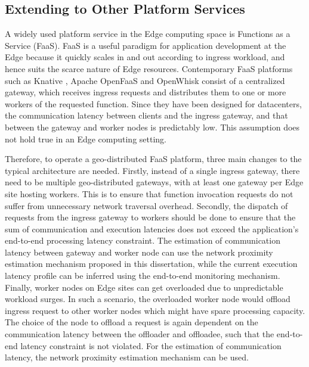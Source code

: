 \subsection{Extending to Other Platform Services}
A widely used platform service in the Edge computing space is Functions as a Service (FaaS). FaaS is a useful paradigm for application development at the Edge because it quickly scales in and out according to ingress workload, and hence suits the scarce nature of Edge resources. Contemporary FaaS platforms such as Knative \cite{knative}, Apache OpenFaaS \cite{openfaas} and OpenWhisk \cite{openwhisk} consist of a centralized gateway, which receives ingress requests and distributes them to one or more workers of the requested function. Since they have been designed for datacenters, the communication latency between clients and the ingress gateway, and that between the gateway and worker nodes is predictably low. This assumption does not hold true in an Edge computing setting.
\par Therefore, to operate a geo-distributed FaaS platform, three main changes to the typical architecture are needed. Firstly, instead of a single ingress gateway, there need to be multiple geo-distributed gateways, with at least one gateway per Edge site hosting workers. This is to ensure that function invocation requests do not suffer from unnecessary network traversal overhead. Secondly, the dispatch of requests from the ingress gateway to workers should be done to ensure that the sum of communication and execution latencies does not exceed the application's end-to-end processing latency constraint. The estimation of communication latency between gateway and worker node can use the network proximity estimation mechanism proposed in this dissertation, while the current execution latency profile can be inferred using the end-to-end monitoring mechanism. Finally, worker nodes on Edge sites can get overloaded due to unpredictable workload surges. In such a scenario, the overloaded worker node would offload ingress request to other worker nodes which might have spare processing capacity. The choice of the node to offload a request is again dependent on the communication latency between the offloader and offloadee, such that the end-to-end latency constraint is not violated. For the estimation of communication latency, the network  proximity estimation mechanism can be used.

